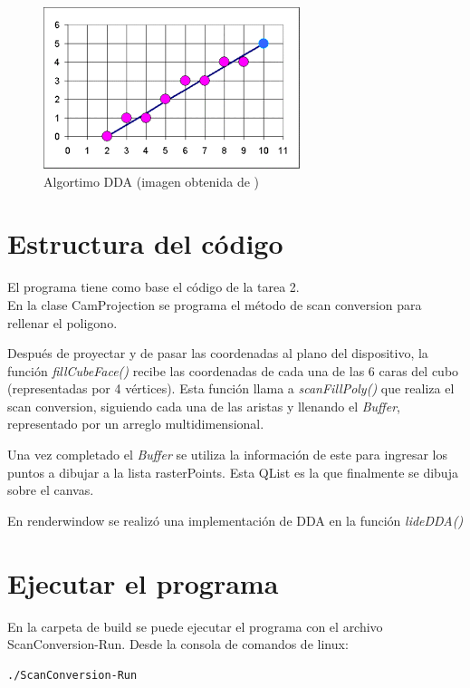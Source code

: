 \documentclass[12pt]{article}
\begin{document}
\begin{figure}[H]
\centering
\includegraphics[scale=0.5]{images/DDA.png}
\caption{Algortimo DDA (imagen obtenida de \cite{dda})}
\end{figure}


  
\section{Estructura del código}

El programa tiene como base el código de la tarea 2.\\

En la clase CamProjection se programa el método de scan conversion para rellenar el poligono.

Después de proyectar y de pasar las coordenadas al plano del dispositivo, la función \textit{fillCubeFace()} recibe las coordenadas de cada una de las 6 caras del cubo (representadas por 4 vértices). Esta función llama a \textit{scanFillPoly()} que realiza el scan conversion, siguiendo cada una de las aristas y llenando el \textit{Buffer}, representado por un arreglo multidimensional.

Una vez completado el \textit{Buffer} se utiliza la información de este para ingresar los puntos a dibujar a la lista rasterPoints. Esta QList es la que finalmente se dibuja sobre el canvas.

En renderwindow se realizó una implementación de DDA en la función \textit{lideDDA()}

\section{Ejecutar el programa}
En la carpeta de build se puede ejecutar el programa con el archivo ScanConversion-Run. Desde la consola de comandos de linux:

\begin{lstlisting}[language=bash,title={bash}]
./ScanConversion-Run
\end{lstlisting}
\end{document}
